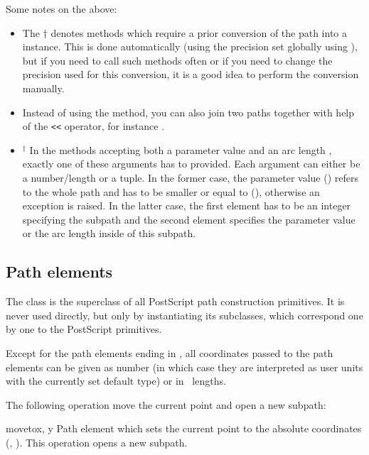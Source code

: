 Some notes on the above:
\begin{itemize}
\item The $\dagger$ denotes methods which require a prior
  conversion of the path into a  instance. This is
  done automatically (using the precision  set globally
  using ), but if you need to call such methods often or
  if you need to change the precision used for this conversion, 
  it is a good idea to perform the conversion manually.
\item Instead of using the  method, you can also join two
paths together with help of the \verb|<<| operator, for instance
.
\item $^\ddagger$ In the methods accepting both a parameter value
   and an arc length , exactly one of these
  arguments has to provided.  Each argument can either be a
  number/length or a tuple.  In the former case, the parameter value
   () refers to the whole path and has to be
  smaller or equal to  (),
  otherwise an exception is raised.  In the latter case, the first
  element has to be an integer specifying the subpath and the second
  element specifies the parameter value or the arc length inside of
  this subpath.
\end{itemize}

\subsection{Path elements}

\label{path:pathitem}

The class  is the superclass of all PostScript path
construction primitives. It is never used directly, but only by
instantiating its subclasses, which correspond one by one to the
PostScript primitives.

Except for the path elements ending in , all coordinates
passed to the path elements can be given as number (in which case they
are interpreted as user units with the currently set default type) or in
\PyX\ lengths.

The following operation move the current point and open a new subpath:

\begin{classdesc}{moveto}{x, y}
Path element which sets the current point to the absolute coordinates (,
). This operation opens a new subpath.
\end{classdesc}

